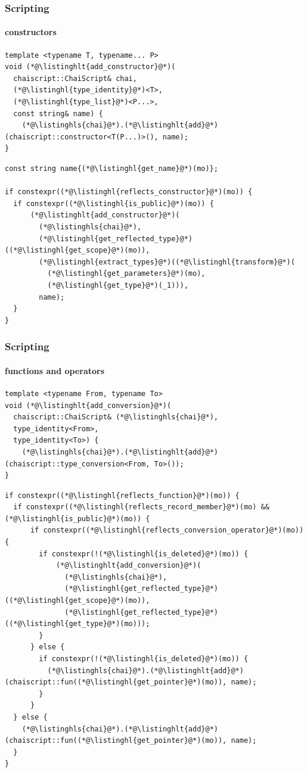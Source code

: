 \documentclass[compress,table,xcolor=table]{beamer}
\begin{document}
\begin{frame}[fragile]
  \frametitle{Scripting}
  \framesubtitle{constructors}
  \begin{lstlisting}[language=c++2x,basicstyle=\scriptsize\ttfamily]
template <typename T, typename... P>
void (*@\listinghlt{add_constructor}@*)(
  chaiscript::ChaiScript& chai,
  (*@\listinghl{type_identity}@*)<T>,
  (*@\listinghl{type_list}@*)<P...>,
  const string& name) {
    (*@\listinghls{chai}@*).(*@\listinghlt{add}@*)(chaiscript::constructor<T(P...)>(), name);
}
  \end{lstlisting}
  \begin{lstlisting}[language=c++2x,basicstyle=\scriptsize\ttfamily]
const string name{(*@\listinghl{get_name}@*)(mo)};

if constexpr((*@\listinghl{reflects_constructor}@*)(mo)) {
  if constexpr((*@\listinghl{is_public}@*)(mo)) {
      (*@\listinghlt{add_constructor}@*)(
        (*@\listinghls{chai}@*),
        (*@\listinghl{get_reflected_type}@*)((*@\listinghl{get_scope}@*)(mo)),
        (*@\listinghl{extract_types}@*)((*@\listinghl{transform}@*)(
          (*@\listinghl{get_parameters}@*)(mo),
          (*@\listinghl{get_type}@*)(_1))),
        name);
  }
}
  \end{lstlisting}
\end{frame}
\begin{frame}[fragile]
  \frametitle{Scripting}
  \framesubtitle{functions and operators}
  \begin{lstlisting}[language=c++2x,basicstyle=\scriptsize\ttfamily]
template <typename From, typename To>
void (*@\listinghlt{add_conversion}@*)(
  chaiscript::ChaiScript& (*@\listinghls{chai}@*),
  type_identity<From>,
  type_identity<To>) {
    (*@\listinghls{chai}@*).(*@\listinghlt{add}@*)(chaiscript::type_conversion<From, To>());
}
  \end{lstlisting}
  \begin{lstlisting}[language=c++2x,basicstyle=\tiny\ttfamily]
if constexpr((*@\listinghl{reflects_function}@*)(mo)) {
  if constexpr((*@\listinghl{reflects_record_member}@*)(mo) && (*@\listinghl{is_public}@*)(mo)) {
      if constexpr((*@\listinghl{reflects_conversion_operator}@*)(mo)) {
        if constexpr(!(*@\listinghl{is_deleted}@*)(mo)) {
            (*@\listinghlt{add_conversion}@*)(
              (*@\listinghls{chai}@*),
              (*@\listinghl{get_reflected_type}@*)((*@\listinghl{get_scope}@*)(mo)),
              (*@\listinghl{get_reflected_type}@*)((*@\listinghl{get_type}@*)(mo)));
        }
      } else {
        if constexpr(!(*@\listinghl{is_deleted}@*)(mo)) {
          (*@\listinghls{chai}@*).(*@\listinghlt{add}@*)(chaiscript::fun((*@\listinghl{get_pointer}@*)(mo)), name);
        }
      }
  } else {
    (*@\listinghls{chai}@*).(*@\listinghlt{add}@*)(chaiscript::fun((*@\listinghl{get_pointer}@*)(mo)), name);
  }
}
  \end{lstlisting}
\end{frame}
\end{document}
